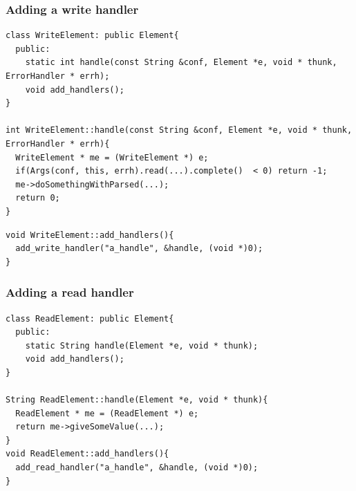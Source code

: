\documentclass{beamer}
\begin{document}
\begin{frame}
\frametitle{Adding a write handler}
\begin{lstlisting}
class WriteElement: public Element{
  public:
    static int handle(const String &conf, Element *e, void * thunk, ErrorHandler * errh);
    void add_handlers();
}

int WriteElement::handle(const String &conf, Element *e, void * thunk, ErrorHandler * errh){
  WriteElement * me = (WriteElement *) e;
  if(Args(conf, this, errh).read(...).complete()  < 0) return -1;
  me->doSomethingWithParsed(...);
  return 0;
}
\end{lstlisting}
\begin{lstlisting}
void WriteElement::add_handlers(){
  add_write_handler("a_handle", &handle, (void *)0);
}
\end{lstlisting}
\end{frame}

\begin{frame}[fragile]
\frametitle{Adding a read handler}
\begin{lstlisting}
class ReadElement: public Element{
  public:
    static String handle(Element *e, void * thunk);
    void add_handlers();
}

String ReadElement::handle(Element *e, void * thunk){
  ReadElement * me = (ReadElement *) e;
  return me->giveSomeValue(...);
}
void ReadElement::add_handlers(){
  add_read_handler("a_handle", &handle, (void *)0);
}
\end{lstlisting}
\end{frame}
\end{document}
